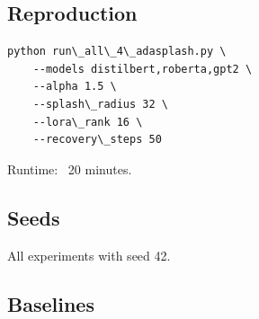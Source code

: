 \subsection{Reproduction}

\begin{lstlisting}
python run\_all\_4\_adasplash.py \
    --models distilbert,roberta,gpt2 \
    --alpha 1.5 \
    --splash\_radius 32 \
    --lora\_rank 16 \
    --recovery\_steps 50
\end{lstlisting}

Runtime: ~20 minutes.

\subsection{Seeds}

All experiments with seed 42.

\subsection{Baselines}
